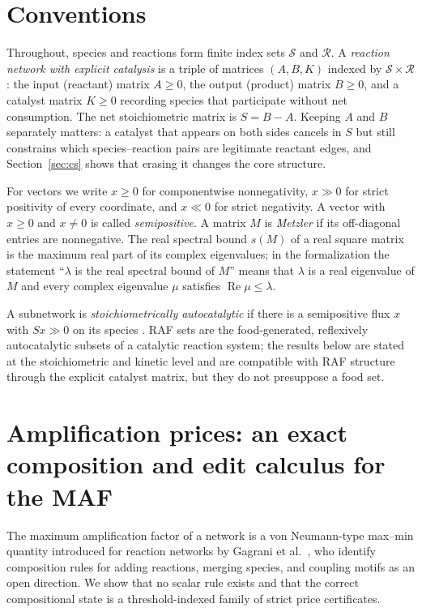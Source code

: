 \documentclass[11pt,a4paper]{article}
\theoremstyle{plain}
\theoremstyle{definition}
\theoremstyle{remark}
\newcommand{\spb}{s}
\begin{document}
\section{Conventions}\label{sec:prelim}

Throughout, species and reactions form finite index sets $\mathcal S$ and $\mathcal R$. A \emph{reaction network with explicit catalysis} is a triple of matrices $(A,B,K)$ indexed by $\mathcal S\times\mathcal R$: the input (reactant) matrix $A\ge 0$, the output (product) matrix $B\ge 0$, and a catalyst matrix $K\ge 0$ recording species that participate without net consumption. The net stoichiometric matrix is $S=B-A$. Keeping $A$ and $B$ separately matters: a catalyst that appears on both sides cancels in $S$ but still constrains which species--reaction pairs are legitimate reactant edges, and Section~\ref{sec:cs} shows that erasing it changes the core structure.

For vectors we write $x\ge 0$ for componentwise nonnegativity, $x\gg 0$ for strict positivity of every coordinate, and $x\ll 0$ for strict negativity. A vector with $x\ge 0$ and $x\neq 0$ is called \emph{semipositive}. A matrix $M$ is \emph{Metzler} if its off-diagonal entries are nonnegative. The real spectral bound $\spb(M)$ of a real square matrix is the maximum real part of its complex eigenvalues; in the formalization the statement ``$\lambda$ is the real spectral bound of $M$'' means that $\lambda$ is a real eigenvalue of $M$ and every complex eigenvalue $\mu$ satisfies $\operatorname{Re}\mu\le\lambda$.

A subnetwork is \emph{stoichiometrically autocatalytic} if there is a semipositive flux $x$ with $Sx\gg 0$ on its species \cite{blokhuis2020,golnik2026bridging}. RAF sets \cite{hordijk2004,steel2019} are the food-generated, reflexively autocatalytic subsets of a catalytic reaction system; the results below are stated at the stoichiometric and kinetic level and are compatible with RAF structure through the explicit catalyst matrix, but they do not presuppose a food set.

\section{Amplification prices: an exact composition and edit calculus for the MAF}\label{sec:maf}

The maximum amplification factor of a network is a von Neumann-type max--min quantity \cite{vonneumann1945,kemeny1956} introduced for reaction networks by Gagrani et al.~\cite{gagrani2026maf}, who identify composition rules for adding reactions, merging species, and coupling motifs as an open direction. We show that no scalar rule exists and that the correct compositional state is a threshold-indexed family of strict price certificates.
\end{document}

